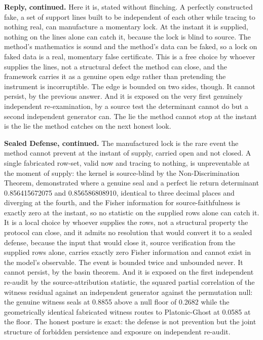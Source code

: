 \documentclass[10pt,twocolumn]{article}
\begin{document}
\textbf{Reply, continued.} Here it is, stated without flinching. A
perfectly constructed fake, a set of support lines built to be
independent of each other while tracing to nothing real, can manufacture
a momentary lock. At the instant it is supplied, nothing on the lines
alone can catch it, because the lock is blind to source. The method's
mathematics is sound and the method's data can be faked, so a lock on
faked data is a real, momentary false certificate. This is a free choice
by whoever supplies the lines, not a structural defect the method can
close, and the framework carries it as a genuine open edge rather than
pretending the instrument is incorruptible. The edge is bounded on two
sides, though. It cannot persist, by the previous answer. And it is
exposed on the very first genuinely independent re-examination, by a
source test the determinant cannot do but a second independent generator
can. The lie the method cannot stop at the instant is the lie the method
catches on the next honest look.

\textbf{Sealed Defense, continued.} The manufactured lock is the rare
event the method cannot prevent at the instant of supply, carried open
and not closed. A single fabricated row-set, valid now and tracing to
nothing, is unpreventable at the moment of supply: the kernel is
source-blind by the Non-Discrimination Theorem, demonstrated where a
genuine seal and a perfect lie return determinant 0.856415672075 and
0.856586808910, identical to three decimal places and diverging at the
fourth, and the Fisher information for source-faithfulness is exactly
zero at the instant, so no statistic on the supplied rows alone can
catch it. It is a local choice by whoever supplies the rows, not a
structural property the protocol can close, and it admits no resolution
that would convert it to a sealed defense, because the input that would
close it, source verification from the supplied rows alone, carries
exactly zero Fisher information and cannot exist in the model's
observable. The event is bounded twice and unbounded never. It cannot
persist, by the basin theorem. And it is exposed on the first
independent re-audit by the source-attribution statistic, the squared
partial correlation of the witness residual against an independent
generator against the permutation null: the genuine witness seals at
0.8855 above a null floor of 0.2682 while the geometrically identical
fabricated witness routes to Platonic-Ghost at 0.0585 at the floor. The
honest posture is exact: the defense is not prevention but the joint
structure of forbidden persistence and exposure on independent re-audit.
\end{document}
